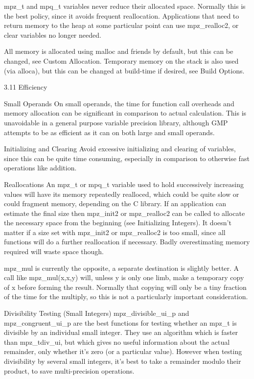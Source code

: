 mpz\_t and mpq\_t variables never reduce their allocated space. Normally this is
the best policy, since it avoids frequent reallocation. Applications that need
to return memory to the heap at some particular point can use mpz\_realloc2, or
clear variables no longer needed.

All memory is allocated using malloc and friends by default, but this can be
changed, see Custom Allocation. Temporary memory on the stack is also used (via
alloca), but this can be changed at build-time if desired, see Build Options.

3.11 Efficiency

Small Operands
On small operands, the time for function call overheads and memory allocation
can be significant in comparison to actual calculation. This is unavoidable in a
general purpose variable precision library, although GMP attempts to be as
efficient as it can on both large and small operands.

Initializing and Clearing
Avoid excessive initializing and clearing of variables, since this can be quite
time consuming, especially in comparison to otherwise fast operations like
addition.

Reallocations
An mpz\_t or mpq\_t variable used to hold successively increasing values will
have its memory repeatedly realloced, which could be quite slow or could
fragment memory, depending on the C library. If an application can estimate the
final size then mpz\_init2 or mpz\_realloc2 can be called to allocate the
necessary space from the beginning (see Initializing Integers).
It doesn't matter if a size set with mpz\_init2 or mpz\_realloc2 is too small,
since all functions will do a further reallocation if necessary. Badly
overestimating memory required will waste space though.

mpz\_mul is currently the opposite, a separate destination is slightly better. A
call like mpz\_mul(x,x,y) will, unless y is only one limb, make a temporary copy
of x before forming the result. Normally that copying will only be a tiny
fraction of the time for the multiply, so this is not a particularly important
consideration.

Divisibility Testing (Small Integers)
mpz\_divisible\_ui\_p and mpz\_congruent\_ui\_p are the best functions for
testing whether an mpz\_t is divisible by an individual small integer. They use
an algorithm which is faster than mpz\_tdiv\_ui, but which gives no useful
information about the actual remainder, only whether it's zero (or a particular
value).
However when testing divisibility by several small integers, it's best to take a
remainder modulo their product, to save multi-precision operations.

